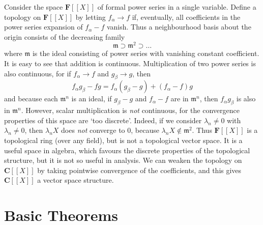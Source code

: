 \begin{example}
    Consider the space $\mathbf{F}[[X]]$ of formal power series in a single variable. Define a topology on $\mathbf{F}[[X]]$ by letting $f_\alpha \to f$ if, eventually, all coefficients in the power series expansion of $f_\alpha - f$ vanish. Thus a neighbourhood basis about the origin consists of the decreasing family
    \[ \mathfrak{m} \supset \mathfrak{m}^2 \supset \dots \]
    where $\mathfrak{m}$ is the ideal consisting of power series with vanishing constant coefficient. It is easy to see that addition is continuous. Multiplication of two power series is also continuous, for if $f_\alpha \to f$ and $g_\beta \to g$, then
    \[ f_\alpha g_\beta - fg = f_\alpha (g_\beta - g) + (f_\alpha - f) g \]
    and because each $\mathfrak{m}^n$ is an ideal, if $g_\beta - g$ and $f_\alpha - f$ are in $\mathfrak{m}^n$, then $f_\alpha g_\beta$ is also in $\mathfrak{m}^n$. However, scalar multiplication is {\it not} continuous, for the convergence properties of this space are `too discrete'. Indeed, if we consider $\lambda_n \neq 0$ with $\lambda_n \neq 0$, then $\lambda_n X$ does {\it not} converge to 0, because $\lambda_n X \not \in \mathfrak{m}^2$. Thus $\mathbf{F}[[X]]$ is a topological ring (over any field), but is not a topological vector space. It is a useful space in algebra, which favours the discrete properties of the topological structure, but it is not so useful in analysis. We can weaken the topology on $\mathbf{C}[[X]]$ by taking pointwise convergence of the coefficients, and this gives $\mathbf{C}[[X]]$ a vector space structure.
\end{example}

\section{Basic Theorems}

